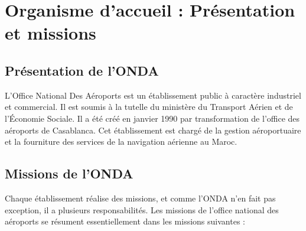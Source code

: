 \documentclass[12pt, a4paper, oneside]{report}
\begin{document}
\section{Organisme d’accueil : Présentation et missions}
\subsection{Présentation de l’ONDA}

L’Office National Des Aéroports est un établissement public 
à caractère industriel et commercial. Il est soumis à la tutelle 
du ministère du Transport Aérien et de l’Économie Sociale. 
Il a été créé en janvier 1990 par transformation de l’office 
des aéroports de Casablanca. Cet établissement est chargé de 
la gestion aéroportuaire et la fourniture des services de la 
navigation aérienne au Maroc.

\subsection{Missions de l’ONDA}

Chaque établissement réalise des missions, et comme l’ONDA n’en fait pas exception, 
il a plusieurs responsabilités. Les missions de l’office national des aéroports se 
résument essentiellement dans les missions suivantes :
\end{document}
